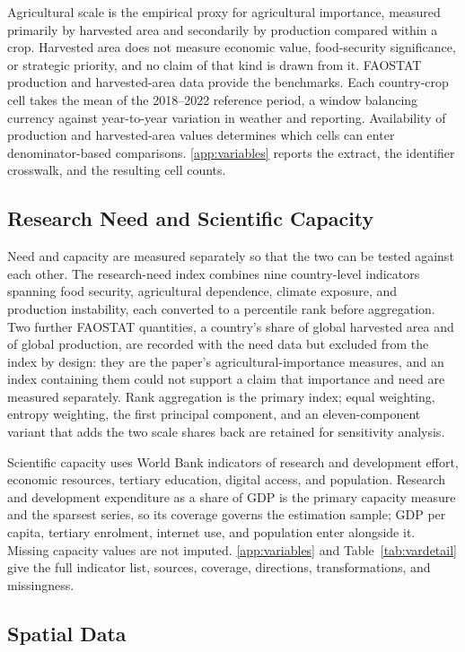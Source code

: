 \documentclass[ASNA,twocolumn]{USG}
\begin{document}
Agricultural scale is the empirical proxy for agricultural importance, measured primarily by
harvested area and secondarily by production compared within a crop. Harvested area does not
measure economic value, food-security significance, or strategic priority, and no claim of that
kind is drawn from it. FAOSTAT production and harvested-area data provide the benchmarks.
Each country-crop cell takes the mean of the 2018--2022 reference period, a window balancing
currency against year-to-year variation in weather and reporting. Availability of production
and harvested-area values determines which cells can enter denominator-based comparisons.
\ref{app:variables} reports the extract, the identifier crosswalk, and the resulting cell
counts.

\subsection{Research Need and Scientific Capacity}

Need and capacity are measured separately so that the two can be tested against each other.
The research-need index combines nine country-level indicators spanning food security,
agricultural dependence, climate exposure, and production instability, each converted to a
percentile rank before aggregation. Two further FAOSTAT quantities, a country's share of
global harvested area and of global production, are recorded with the need data but excluded
from the index by design: they are the paper's agricultural-importance measures, and an index
containing them could not support a claim that importance and need are measured separately.
Rank aggregation is the primary index; equal weighting, entropy weighting, the first
principal component, and an eleven-component variant that adds the two scale shares back are
retained for sensitivity analysis.

Scientific capacity uses World Bank indicators of research and development effort, economic
resources, tertiary education, digital access, and population. Research and development
expenditure as a share of GDP is the primary capacity measure and the sparsest series, so its
coverage governs the estimation sample; GDP per capita, tertiary enrolment, internet use, and
population enter alongside it. Missing capacity values are not imputed.
\ref{app:variables} and Table~\ref{tab:vardetail} give the full indicator list, sources,
coverage, directions, transformations, and missingness.

\subsection{Spatial Data}
\end{document}
